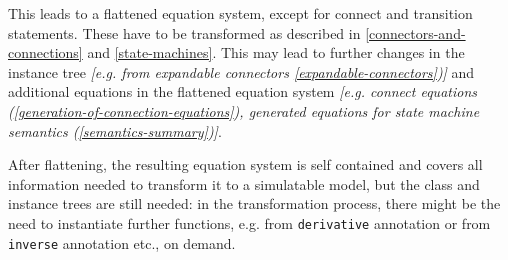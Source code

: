 This leads to a flattened equation system, except for connect and
transition statements. These have to be transformed as described in
\autoref{connectors-and-connections} and \autoref{state-machines}. This may lead to further changes in the
instance tree \emph{{[}e.g. from expandable connectors \autoref{expandable-connectors}){]}}
and additional equations in the flattened equation
system \emph{{[}e.g. connect equations (\autoref{generation-of-connection-equations}), generated
equations for state machine semantics (\autoref{semantics-summary}){]}}.

\begin{nonnormative}
After flattening, the resulting equation system is self
contained and covers all information needed to transform it to a
simulatable model, but the class and instance trees are still needed: in
the transformation process, there might be the need to instantiate
further functions, e.g. from \lstinline!derivative! annotation or from \lstinline!inverse!
annotation etc., on demand.
\end{nonnormative}
